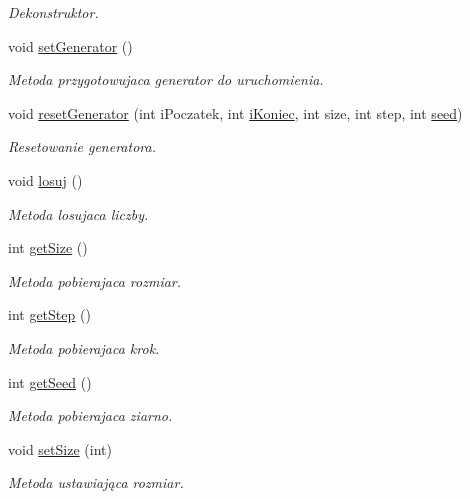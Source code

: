 \begin{DoxyCompactItemize}
\begin{DoxyCompactList}\small\item\em Dekonstruktor. \end{DoxyCompactList}\item 
void \hyperlink{classGenerator3_a240980004aee2739b768def7ef71eedd}{set\+Generator} ()
\begin{DoxyCompactList}\small\item\em Metoda przygotowujaca generator do uruchomienia. \end{DoxyCompactList}\item 
void \hyperlink{classGenerator3_a5572186e8bb586ecf526f5db2a657c7d}{reset\+Generator} (int i\+Poczatek, int \hyperlink{classGenerator_a235b3d02ce62d19e803cc2295eb7911e}{i\+Koniec}, int size, int step, int \hyperlink{classGenerator_ae77446ccb4946b8eb28d0f20f3e4a95f}{seed})
\begin{DoxyCompactList}\small\item\em Resetowanie generatora. \end{DoxyCompactList}\item 
void \hyperlink{classGenerator3_a89928ff47b804aa4af9dfd67c458c92b}{losuj} ()
\begin{DoxyCompactList}\small\item\em Metoda losujaca liczby. \end{DoxyCompactList}\item 
int \hyperlink{classGenerator3_ab12aab6f893a507374a3f7af706babf5}{get\+Size} ()
\begin{DoxyCompactList}\small\item\em Metoda pobierajaca rozmiar. \end{DoxyCompactList}\item 
int \hyperlink{classGenerator3_a461d34d597de24d4f3fb2d0582dbdc73}{get\+Step} ()
\begin{DoxyCompactList}\small\item\em Metoda pobierajaca krok. \end{DoxyCompactList}\item 
int \hyperlink{classGenerator3_a8cb1ea0705c811ea15e6526f95b3d220}{get\+Seed} ()
\begin{DoxyCompactList}\small\item\em Metoda pobierajaca ziarno. \end{DoxyCompactList}\item 
void \hyperlink{classGenerator3_a1ddc34bcde320baf2548f78667354ce9}{set\+Size} (int)
\begin{DoxyCompactList}\small\item\em Metoda ustawiająca rozmiar. \end{DoxyCompactList}\item 

\end{DoxyCompactItemize}
